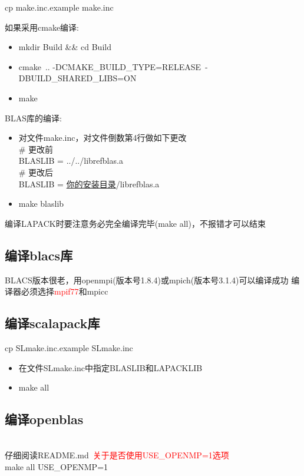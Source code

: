 \documentclass[10pt,a4paper]{article}
\begin{document}
\textrm{cp make.inc.example make.inc}

如果采用\textrm{cmake}编译:
\begin{itemize}
	\item \textrm{mkdir Build \&\& cd Build}
	\item \textrm{cmake~.. -DCMAKE\_BUILD\_TYPE=RELEASE~-DBUILD_SHARED_LIBS=ON}
	\item \textrm{make}
\end{itemize}

\textrm{BLAS}库的编译:
\begin{itemize}
	\item  对文件\textrm{make.inc}，对文件倒数第4行做如下更改\\
	\# 更改前\\
	\textrm{BLASLIB      = ../../librefblas.a} \\
\# 更改后\\
\textrm{BLASLIB      = \underline{你的安装目录}/librefblas.a}
\item \textrm{make blaslib}
\end{itemize}
编译\textrm{LAPACK}时要注意务必完全编译完毕(\textrm{make all})，不报错才可以结束

\subsection{编译{\rm blacs}库}
\textrm{BLACS}版本很老，用\textrm{openmpi}(版本号\textrm{1.8.4})或\textrm{mpich}(版本号\textrm{3.1.4})可以编译成功
编译器必须选择\textcolor{red}{\textrm{mpif77}}和\textrm{mpicc}

\subsection{编译{\rm scalapack}库}
\textrm{cp SLmake.inc.example SLmake.inc}
\begin{itemize}
	\item 在文件\textrm{SLmake.inc}中指定\textrm{BLASLIB}和\textrm{LAPACKLIB}
	\item \textrm{make all}
\end{itemize}

\subsection{编译{\rm openblas}}\\
仔细阅读\textrm{README.md}~\textcolor{red}{关于是否使用\textrm{USE_OPENMP=1}选项}\\
	\textrm{make all USE_OPENMP=1}
\end{document}
